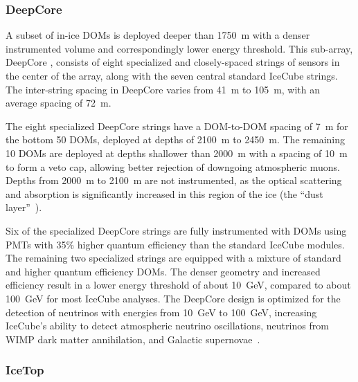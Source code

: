 \subsubsection{DeepCore}

A subset of in-ice DOMs is deployed deeper than \SI{1750}{\meter} with a denser instrumented volume and
correspondingly lower energy threshold. This
sub-array, DeepCore \cite{ICECUBE:DC}, consists of eight specialized and
closely-spaced strings of sensors in the center of the array, along with
the seven central standard IceCube strings. The inter-string spacing
in DeepCore varies from \SI{41}{\meter} to \SI{105}{\meter}, with an
average spacing of \SI{72}{\meter}.

The eight specialized DeepCore strings have a DOM-to-DOM spacing of
\SI{7}{\meter} for the bottom 50 DOMs, deployed at depths of
\SI{2100}{\meter} to \SI{2450}{\meter}.  The remaining 10 DOMs are
deployed at depths shallower than \SI{2000}{\meter} with a spacing of
\SI{10}{\meter} to form a veto cap, allowing better rejection of downgoing
atmospheric muons.  Depths from \SI{2000}{\meter} to \SI{2100}{\meter}
are not instrumented, as the optical scattering and absorption is
significantly increased in this region of the ice (the ``dust layer''~\cite{Aartsen:2013rt}).

Six of the specialized DeepCore strings are fully instrumented with
DOMs using PMTs with 35\% higher quantum efficiency than the
standard IceCube modules. The remaining two specialized strings are
equipped with a mixture of standard and higher quantum efficiency DOMs. The denser geometry and increased efficiency
result in a lower energy threshold of about
\SI{10}{\giga\electronvolt}, compared to about
\SI{100}{\giga\electronvolt} for most IceCube analyses. The DeepCore design
is optimized for the detection of neutrinos with energies
from \SI{10}{\giga\electronvolt} to \SI{100}{\giga\electronvolt},
increasing IceCube's ability to detect atmospheric neutrino
oscillations, neutrinos from WIMP dark matter annihilation, and Galactic
supernovae~\cite{ICECUBE:DC}. 

\subsubsection{IceTop}

